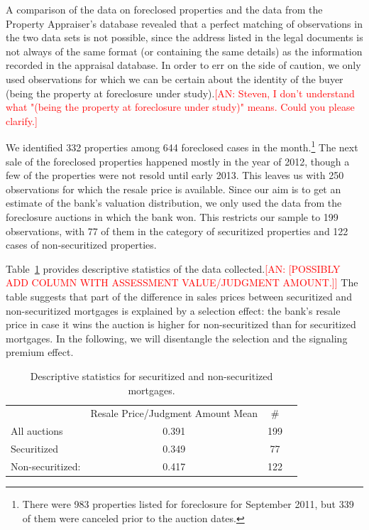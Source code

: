 \documentclass[11pt,twopage]{article}
\newcommand{\AN}[1]{\textcolor{red}{[AN: #1]}}
\begin{document}
A comparison of the data on foreclosed properties and the data from the Property Appraiser's database revealed that a perfect matching of observations in the two data sets is not possible, since the address listed in the legal documents is not always of the same format (or containing the same details) as the information recorded in the appraisal database. In order to err on the side of caution, we only used observations for which we can be certain about the identity of the buyer (being the property at foreclosure under study).\AN{Steven, I don't understand what "(being the property at foreclosure under study)" means. Could you please clarify.} 

We identified 332 properties among 644 foreclosed cases in the month.\footnote{There were 983 properties listed for foreclosure for September 2011, but 339 of them were canceled prior to the auction dates.} The next sale of the foreclosed properties happened mostly in the year of 2012, though a few of the properties were not resold until early 2013. This leaves us with 250 observations for which the resale price is available. Since our aim is to get an estimate of the bank's valuation distribution, we only used the data from the foreclosure auctions in which the bank won. This restricts our sample to 199 observations, with 77 of them in the category of securitized properties and 122 cases of non-securitized properties. 

Table~\ref{tab:descriptive-securitization-resale} provides descriptive
statistics of the data collected.\AN{[POSSIBLY ADD COLUMN WITH ASSESSMENT
VALUE/JUDGMENT AMOUNT.]} The table suggests that part of the difference
in sales prices between securitized and non-securitized mortgages is
explained by a selection effect: the bank's resale price in case it
wins the auction is higher for non-securitized than for securitized
mortgages. In the following, we will disentangle the selection and the
signaling premium effect.

\begin{table}[!htbp]
	\centering \caption{Descriptive statistics for securitized and
		non-securitized mortgages. %
		\label{tab:descriptive-securitization-resale}}
	\begin{tabular}{lccc}
		\hline\hline
		& Resale Price/Judgment Amount Mean %
		& \#\\
		All auctions & 0.391 %
		& 199 \\
		Securitized & 0.349 %
		& 77 \\
		Non-securitized: & 0.417 %
		& 122 \\
		\hline
	\end{tabular}
\end{table}
\end{document}
